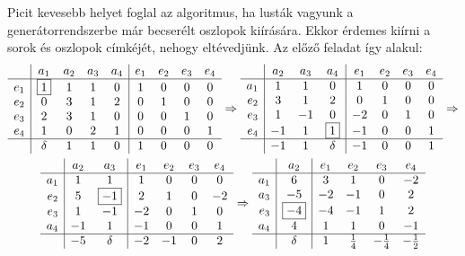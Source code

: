 \documentclass[9pt, showtrims]{memoir}
\theoremstyle{plain}
\theoremstyle{remark}
\theoremstyle{definition}
\begin{document}
Picit kevesebb helyet foglal az algoritmus, ha lusták vagyunk a generátorrendszerbe már becserélt 
oszlopok kiírására. 
Ekkor érdemes kiírni a sorok és oszlopok címkéjét, nehogy eltévedjünk.
Az előző feladat így alakul:
\begin{multline*}
    \begin{array}{r|cccc|cccc}
        &a_1&a_2&a_3&a_4&e_1&e_2&e_3&e_4\\
        \hline
        e_1&\boxed{1}&1&1&0 & 1&0&0&0\\
        e_2&0&3&1&2 & 0&1&0&0\\
        e_3&2&3&1&0 & 0&0&1&0\\
        e_4&1&0&2&1 & 0&0&0&1\\
        \hline
        &\delta&1&1&0&1&0&0&0
    \end{array}\Rightarrow
    \begin{array}{r|ccc|cccc}
        &a_2&a_3&a_4&e_1&e_2&e_3&e_4\\
        \hline
        a_1&1&1&0 & 1&0&0&0\\
        e_2&3&1&2 & 0&1&0&0\\
        e_3&1&-1&0 & -2&0&1&0\\
        e_4&-1&1&\boxed{1} & -1&0&0&1\\
        \hline
        &-1&1&\delta&-1&0&0&1
    \end{array}\Rightarrow
    \\
    \begin{array}{r|cc|cccc}
        &a_2&a_3&e_1&e_2&e_3&e_4\\
        \hline
        a_1& 1& 1&  1& 0& 0& 0\\
        e_2& 5& \boxed{-1}&  2& 1& 0& -2\\
        e_3& 1&-1& -2& 0& 1& 0\\
        a_4&-1& 1& -1& 0& 0& 1\\
        \hline
        &-5&\delta&-2&-1&0&2
    \end{array}\Rightarrow
    \begin{array}{r|c|cccc}
        &a_2&e_1&e_2&e_3&e_4\\
        \hline
        a_1&           6&   3& 1& 0& -2\\
        a_3&          -5&  -2&-1& 0&  2\\
        e_3&\boxed{-4}  &  -4&-1& 1&  2\\
        a_4&           4&   1& 1& 0& -1\\
        \hline
        &\delta      &   1&\frac{1}{4}&-\frac{1}{4}&-\frac{1}{2}

\end{array}
\end{multline*}
\end{document}
